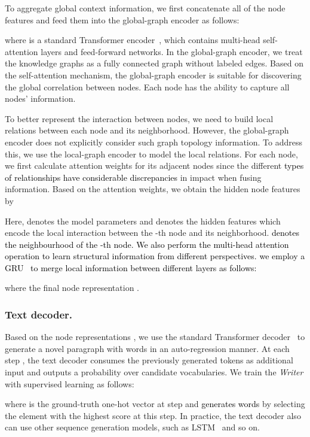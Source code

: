 \documentclass[letterpaper]{article}
\def\hmg{\textcolor{black}}
\begin{document}
To aggregate global context information, we first concatenate all of the node features  and feed them into the global-graph encoder  as follows:

where  is a standard Transformer encoder~\cite{Vaswani2017AttentionIA}, which contains multi-head self-attention layers and feed-forward networks. In the global-graph encoder, we treat the knowledge graphs  as a fully connected graph without labeled edges. Based on the self-attention mechanism, the global-graph encoder is suitable for discovering the global correlation between nodes. Each node  has the ability to capture all nodes' information.

To better represent the interaction between nodes, we need to build local relations between each node and its neighborhood. However, the global-graph encoder does not explicitly consider such graph topology information. To address this, we use the local-graph encoder to model the local relations. 
For each node, we first calculate attention weights for its adjacent nodes since the different 
\hmg{types of relationships have considerable discrepancies }
in impact when fusing information. Based on the attention weights, we obtain the hidden node features  by

Here,  denotes the model parameters and   denotes the hidden features which encode the local interaction between the -th node and its neighborhood.
\hmg{ denotes the neighbourhood of the -th node.
We also perform the multi-head attention operation to learn structural information from different perspectives.}
\hmg{we employ a GRU~\cite{Cho2014LearningPR} to merge local information between different layers as follows:}




where the final node representation .


\subsubsection{Text decoder.}

Based on the node representations , we use the standard Transformer decoder~\cite{Vaswani2017AttentionIA} to generate a novel paragraph  with  words in an auto-regression manner. At each step , the text decoder consumes the previously generated tokens as additional input and outputs a probability  over candidate vocabularies. 
We train the \textit{Writer} with supervised learning as follows:

where  is the ground-truth one-hot vector at step  and \hmg{generates words} by selecting the element with the highest score at this step. In practice, the text decoder also can use other sequence generation models, such as LSTM~\cite{LSTM} and so on. 
\end{document}
